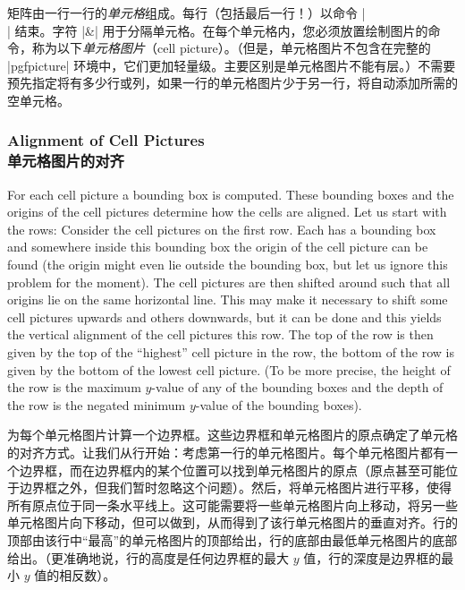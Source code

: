 矩阵由一行一行的\emph{单元格}组成。每行（包括最后一行！）以命令 |\\| 结束。字符 |&| 用于分隔单元格。在每个单元格内，您必须放置绘制图片的命令，称为以下\emph{单元格图片}（cell picture）。（但是，单元格图片不包含在完整的 |{pgfpicture}| 环境中，它们更加轻量级。主要区别是单元格图片不能有层。）不需要预先指定将有多少行或列，如果一行的单元格图片少于另一行，将自动添加所需的空单元格。

\subsubsection{Alignment of Cell Pictures\\单元格图片的对齐}

For each cell picture a bounding box is computed. These bounding boxes and the
origins of the cell pictures determine how the cells are aligned. Let us start
with the rows: Consider the cell pictures on the first row. Each has a bounding
box and somewhere inside this bounding box the origin of the cell picture can
be found (the origin might even lie outside the bounding box, but let us ignore
this problem for the moment). The cell pictures are then shifted around such
that all origins lie on the same horizontal line. This may make it necessary to
shift some cell pictures upwards and others downwards, but it can be done and
this yields the vertical alignment of the cell pictures this row. The top of
the row is then given by the top of the ``highest'' cell picture in the row,
the bottom of the row is given by the bottom of the lowest cell picture. (To be
more precise, the height of the row is the maximum $y$-value of any of the
bounding boxes and the depth of the row is the negated minimum $y$-value of the
bounding boxes).

为每个单元格图片计算一个边界框。这些边界框和单元格图片的原点确定了单元格的对齐方式。让我们从行开始：考虑第一行的单元格图片。每个单元格图片都有一个边界框，而在边界框内的某个位置可以找到单元格图片的原点（原点甚至可能位于边界框之外，但我们暂时忽略这个问题）。然后，将单元格图片进行平移，使得所有原点位于同一条水平线上。这可能需要将一些单元格图片向上移动，将另一些单元格图片向下移动，但可以做到，从而得到了该行单元格图片的垂直对齐。行的顶部由该行中“最高”的单元格图片的顶部给出，行的底部由最低单元格图片的底部给出。（更准确地说，行的高度是任何边界框的最大 $y$ 值，行的深度是边界框的最小 $y$ 值的相反数）。

%
\begin{codeexample}[]
\end{codeexample}

